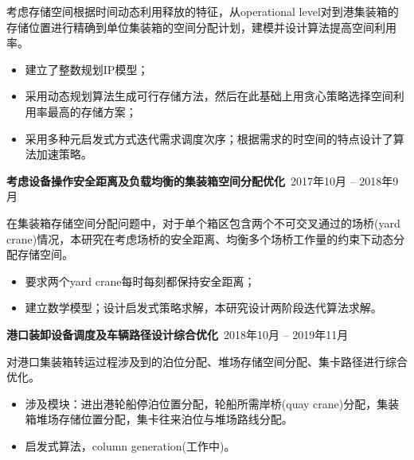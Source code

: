 \documentclass[11pt]{article}
\begin{document}
考虑存储空间根据时间动态利用释放的特征，从operational level对到港集装箱的存储位置进行精确到单位集装箱的空间分配计划，建模并设计算法提高空间利用率。

\begin{itemize}
  \item 建立了整数规划IP模型；
  \item 采用动态规划算法生成可行存储方法，然后在此基础上用贪心策略选择空间利用率最高的存储方案；
  \item 采用多种元启发式方式迭代需求调度次序；根据需求的时空间的特点设计了算法加速策略。
\end{itemize}

\textbf{考虑设备操作安全距离及负载均衡的集装箱空间分配优化}\  \hfill 2017年10月 -- 2018年9月

在集装箱存储空间分配问题中，对于单个箱区包含两个不可交叉通过的场桥(yard crane)情况，本研究在考虑场桥的安全距离、均衡多个场桥工作量的约束下动态分配存储空间。
\begin{itemize}
  \item 要求两个yard crane每时每刻都保持安全距离；
  \item 建立数学模型；设计启发式策略求解，本研究设计两阶段迭代算法求解。
\end{itemize}

\textbf{港口装卸设备调度及车辆路径设计综合优化}\  \hfill 2018年10月 -- 2019年11月

对港口集装箱转运过程涉及到的泊位分配、堆场存储空间分配、集卡路径进行综合优化。
\begin{itemize}
  \item 涉及模块：进出港轮船停泊位置分配，轮船所需岸桥(quay crane)分配，集装箱堆场存储位置分配，集卡往来泊位与堆场路线分配。
  \item 启发式算法，column generation(工作中)。
\end{itemize}
\end{document}
